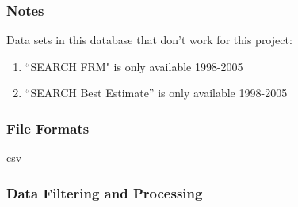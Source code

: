 
\subsubsection*{Notes}

Data sets in this database that don't work for this project:
\begin{enumerate}
\item ``SEARCH FRM" is only available 1998-2005
\item ``SEARCH Best Estimate'' is only available 1998-2005
\end{enumerate}

\subsubsection*{File Formats} 
csv

\subsubsection*{Data Filtering and Processing}



